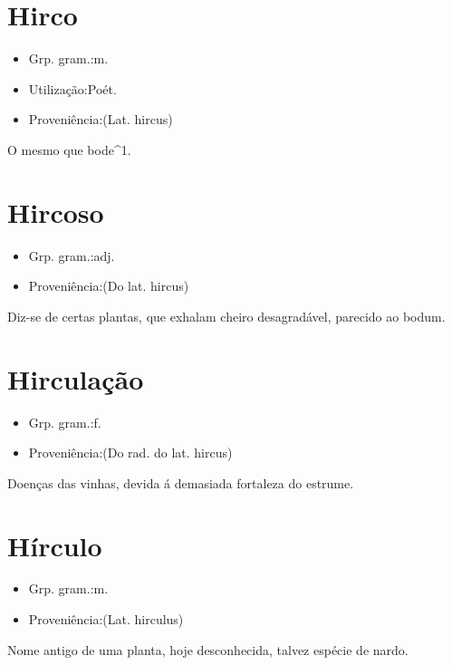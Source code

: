 \documentclass{article}
\begin{document}
\section{Hirco}
\begin{itemize}
\item {Grp. gram.:m.}
\end{itemize}
\begin{itemize}
\item {Utilização:Poét.}
\end{itemize}
\begin{itemize}
\item {Proveniência:(Lat. \textunderscore hircus\textunderscore )}
\end{itemize}
O mesmo que \textunderscore bode\textunderscore ^1.
\section{Hircoso}
\begin{itemize}
\item {Grp. gram.:adj.}
\end{itemize}
\begin{itemize}
\item {Proveniência:(Do lat. \textunderscore hircus\textunderscore )}
\end{itemize}
Diz-se de certas plantas, que exhalam cheiro desagradável, parecido ao bodum.
\section{Hirculação}
\begin{itemize}
\item {Grp. gram.:f.}
\end{itemize}
\begin{itemize}
\item {Proveniência:(Do rad. do lat. \textunderscore hircus\textunderscore )}
\end{itemize}
Doenças das vinhas, devida á demasiada fortaleza do estrume.
\section{Hírculo}
\begin{itemize}
\item {Grp. gram.:m.}
\end{itemize}
\begin{itemize}
\item {Proveniência:(Lat. \textunderscore hirculus\textunderscore )}
\end{itemize}
Nome antigo de uma planta, hoje desconhecida, talvez espécie de nardo.
\end{document}
